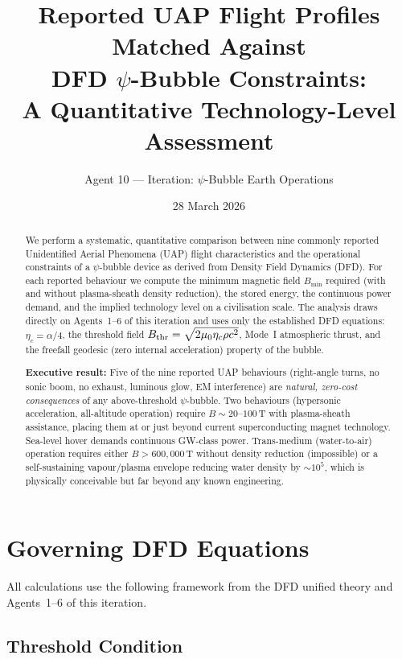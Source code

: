 \documentclass[12pt,a4paper]{article}
\title{Reported UAP Flight Profiles Matched Against\\
DFD $\psi$-Bubble Constraints:\\
\large A Quantitative Technology-Level Assessment}
\author{Agent 10 --- Iteration: $\psi$-Bubble Earth Operations}
\date{28 March 2026}
\begin{document}
\maketitle

\begin{abstract}
We perform a systematic, quantitative comparison between nine commonly reported
Unidentified Aerial Phenomena (UAP) flight characteristics and the operational
constraints of a $\psi$-bubble device as derived from Density Field Dynamics (DFD).
For each reported behaviour we compute the minimum magnetic field $B_{\min}$
required (with and without plasma-sheath density reduction), the stored energy,
the continuous power demand, and the implied technology level on a civilisation
scale.  The analysis draws directly on Agents~1--6 of this iteration and uses
only the established DFD equations: $\eta_c = \alpha/4$, the threshold field
$B_{\rm thr} = \sqrt{2\mu_0 \eta_c \rho c^2}$, Mode~I atmospheric thrust,
and the freefall geodesic (zero internal acceleration) property of the bubble.

\medskip\noindent
\textbf{Executive result:}
Five of the nine reported UAP behaviours (right-angle turns, no sonic boom,
no exhaust, luminous glow, EM interference) are \emph{natural, zero-cost
consequences} of any above-threshold $\psi$-bubble.  Two behaviours
(hypersonic acceleration, all-altitude operation) require $B \sim 20$--$100$\,T
with plasma-sheath assistance, placing them at or just beyond current
superconducting magnet technology.  Sea-level hover demands continuous
GW-class power.  Trans-medium (water-to-air) operation requires either
$B > 600{,}000$\,T without density reduction (impossible) or a self-sustaining
vapour/plasma envelope reducing water density by $\sim 10^5$, which is
physically conceivable but far beyond any known engineering.
\end{abstract}

\tableofcontents
\newpage

\section{Governing DFD Equations}\label{sec:governing}

All calculations use the following framework from the DFD unified theory
and Agents~1--6 of this iteration.

\subsection{Threshold Condition}
\end{document}
